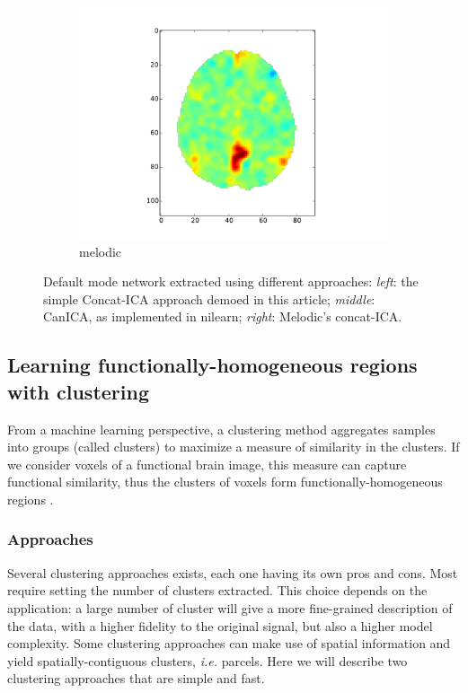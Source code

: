 \documentclass{frontiersSCNS} %
\begin{document}
\begin{figure}[hbtp]
\begin{center}
\begin{subfigure}[b]{.3\linewidth}
        \includegraphics[width=\linewidth]{img/ica/melodic}
        \caption{melodic}
      \end{subfigure}
  \end{center}
  \caption{Default mode network extracted using different approaches:
\emph{left}: the simple Concat-ICA approach demoed in this article;
\emph{middle}: CanICA, as implemented in nilearn; \emph{right}: Melodic's
concat-ICA.}
  \label{fig:ica}
\end{figure}

\subsection{Learning functionally-homogeneous regions with clustering}
\label{clustering}

From a machine learning perspective, a clustering method aggregates 
samples into groups (called clusters) to maximize a measure of similarity in
the clusters. If we consider voxels of a functional brain image, this 
measure can capture functional similarity, thus the clusters of voxels
form functionally-homogeneous regions \citep{thirion2006}.

\subsubsection{Approaches}

Several clustering approaches exists, each one having its own pros and
cons. Most require setting the number of clusters extracted. This choice
depends on the application: a large number of cluster will give a more
fine-grained description of the data, with a higher fidelity to the
original signal, but also a higher model complexity. Some clustering
approaches can make use of spatial information and yield
spatially-contiguous clusters, \emph{i.e.} parcels. Here we will describe
two clustering approaches that are simple and fast.
\end{document}

